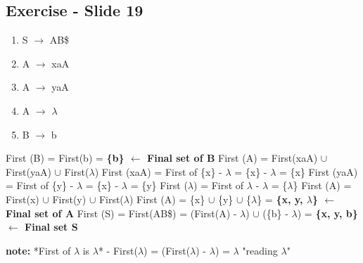 \documentclass{report}
\begin{document}
\subsection{Exercise - Slide 19}
\vspace{-1.5em}
\begin{multicols}{2}
  \begin{enumerate}
    \setlength\itemsep{-.25em}
    \item S $\rightarrow$ AB\$
    \item A $\rightarrow$ xaA
    \item A $\rightarrow$ yaA
    \item A $\rightarrow$ $\lambda$
    \item B $\rightarrow$ b\newline\newline\newline\newline
  \end{enumerate}
  \setlength{\leftskip}{-12em}
First (B) = First(b) = \textbf{ \{b\}  $\leftarrow$ Final set of B}\newline
First (A) = First(xaA) $\cup$  First(yaA) $\cup$  First($\lambda$)\newline
\indent\hspace{.25cm}First (xaA) = First of \{x\} - $\lambda$ = \{x\} - $\lambda$ = \{x\}\newline
\indent\hspace{.25cm}First (yaA) = First of \{y\} - $\lambda$ = \{x\} - $\lambda$ = \{y\}\newline
\indent\hspace{.25cm}First ($\lambda$) = First of {$\lambda$} - $\lambda$ = \{$\lambda$\}\newline
First (A) = First(x) $\cup$  First(y) $\cup$  First($\lambda$)\newline
First (A) = \{x\} $\cup$  \{y\} $\cup$  \{$\lambda$\} = \textbf{ \{x, y, $\lambda$\} $\leftarrow$ Final set of A}\newline
First (S) = First(AB\$) = (First(A) - $\lambda$) $\cup$ (\{b\} - $\lambda$) = \textbf{\{x, y, b\} $\leftarrow$ Final set S}
\end{multicols}
\vspace{-1em}
\noindent\textbf{note:} *First of $\lambda$ is $\lambda$* -
First($\lambda$) = (First($\lambda$) - $\lambda$) = {$\lambda$} "reading $\lambda$" 
\end{document}
